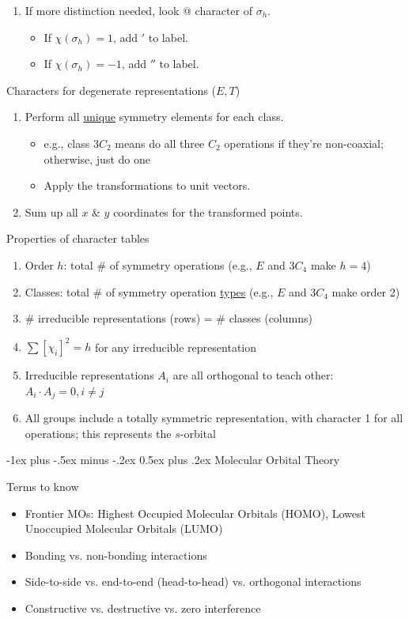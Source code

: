 \documentclass[10pt,landscape]{article}
\makeatletter
\renewcommand{\section}{\@startsection{section}{1}{0mm}%
                                {-1ex plus -.5ex minus -.2ex}%
                                {0.5ex plus .2ex}%
                                {\normalfont\large\bfseries}}
\makeatother
\begin{document}
\begin{multicols}{3}
\begin{enumerate}
	\item If more distinction needed, look @ character of $\sigma_h$.
	\begin{itemize}
		\item If $\chi(\sigma_h)=1$, add $'$ to label.
		\item If $\chi(\sigma_h)=-1$, add $''$ to label.
	\end{itemize}
\end{enumerate}

Characters for degenerate representations ($E, T$)
\begin{enumerate}
	\item Perform all \underline{unique} symmetry elements for each class.
	\begin{itemize}
		\item e.g., class $3C_2$ means do all three $C_2$ operations if they're non-coaxial; otherwise, just do one
		\item Apply the transformations to unit vectors.
	\end{itemize}
	\item Sum up all $x$ \& $y$ coordinates for the transformed points.
\end{enumerate}

Properties of character tables
\begin{enumerate}
	\item Order $h$: total \# of symmetry operations (e.g., $E$ and $3C_4$ make $h=4$)
	\item  Classes: total \# of symmetry operation \underline{types} (e.g., $E$ and $3C_4$ make order 2)
	\item \# irreducible representations (rows) = \# classes (columns)
	\item $\sum [\chi_i ]^2 = h$ for any irreducible representation
	\item Irreducible representations $A_i$ are all orthogonal to teach other: ${A_i} \cdot {A_j} = 0, i\neq j$ 
	\item All groups include a totally symmetric representation, with character 1 for all operations; this represents the $s$-orbital
\end{enumerate}

\hrulefill

\section{Molecular Orbital Theory}

Terms to know
\begin{itemize}
	\item Frontier MOs: Highest Occupied Molecular Orbitals (HOMO),  Lowest Unoccupied Molecular Orbitals (LUMO)
	\item Bonding vs. non-bonding interactions
	\item Side-to-side vs. end-to-end (head-to-head) vs. orthogonal interactions
	\item Constructive vs. destructive vs. zero interference
\end{itemize}




\end{multicols}
\end{document}
